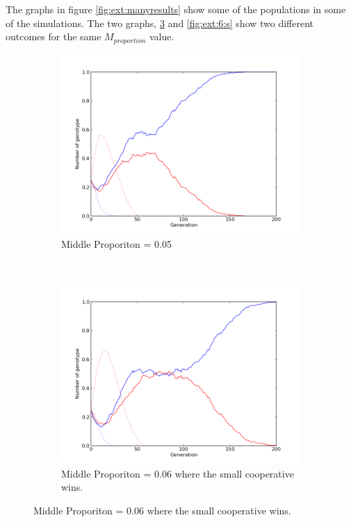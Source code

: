 \documentclass[11pt]{ecsarticle}
\begin{document}
The graphs in figure \ref{fig:ext:manyresults} show some of the populations in some of the simulations. 
The two graphs, \ref{fig:ext:6:c} and \ref{fig:ext:6:s} show two different outcomes for the same $M_{proportion}$ value. 

\begin{figure}
        \centering
        \begin{subfigure}[b]{0.4\textwidth}
                \includegraphics[width=\textwidth]{Code2/mprop_05.png}
                \caption{Middle Proporiton = 0.05}
                \label{fig:rep:5}
        \end{subfigure}%
        ~ %
        \begin{subfigure}[b]{0.4\textwidth}
                \includegraphics[width=\textwidth]{Code2/mprop_06.png}
                \caption{Middle Proporiton = 0.06 where the small cooperative wins.}
                \label{fig:ext:6:c}
        \end{subfigure}
        

\end{figure}
\end{document}
